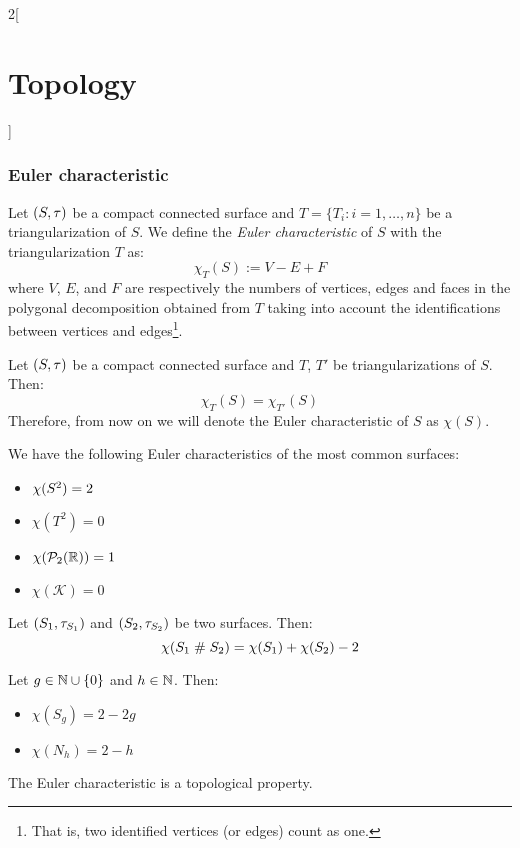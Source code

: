 \documentclass[../../../main_math.tex]{subfiles}
\begin{document}
\begin{multicols}{2}[\section{Topology}]
  \subsubsection{Euler characteristic}
  \begin{definition}
    Let $(S,\topo)$ be a compact connected surface and $T=\{T_i:i=1,\ldots,n\}$ be a triangularization of $S$. We define the \emph{Euler characteristic} of $S$ with the triangularization $T$ as: $$\chi_T(S):=V-E+F$$ where $V$, $E$, and $F$ are respectively the numbers of vertices, edges and faces in the polygonal decomposition obtained from $T$ taking into account the identifications between vertices and edges\footnote{That is, two identified vertices (or edges) count as one.}.
  \end{definition}
  \begin{proposition}
    Let $(S,\topo)$ be a compact connected surface and $T$, $T'$ be triangularizations of $S$. Then: $$\chi_T(S)=\chi_{T'}(S)$$ Therefore, from now on we will denote the Euler characteristic of $S$ as $\chi(S)$.
  \end{proposition}
  \begin{proposition}
    We have the following Euler characteristics of the most common surfaces:
    \begin{itemize}
      \item $\chi(\S^2)=2$
      \item $\chi(T^2)=0$
      \item $\chi(\mathcal{P}_2(\RR))=1$
      \item $\chi(\mathcal{K})=0$
    \end{itemize}
  \end{proposition}
  \begin{proposition}
    Let $(S_1,\topo_{S_1})$ and $(S_2,\topo_{S_2})$ be two surfaces. Then: $$\chi(S_1\conn S_2)=\chi(S_1)+\chi(S_2)-2$$
  \end{proposition}
  \begin{corollary}
    Let $g\in\NN\cup\{0\}$ and $h\in\NN$. Then:
    \begin{itemize}
      \item $\chi(S_g)=2-2g$
      \item $\chi(N_h)=2-h$
    \end{itemize}
  \end{corollary}
  \begin{theorem}
    The Euler characteristic is a topological property.
  \end{theorem}
  \begin{theorem}

\end{theorem}
\end{multicols}
\end{document}
